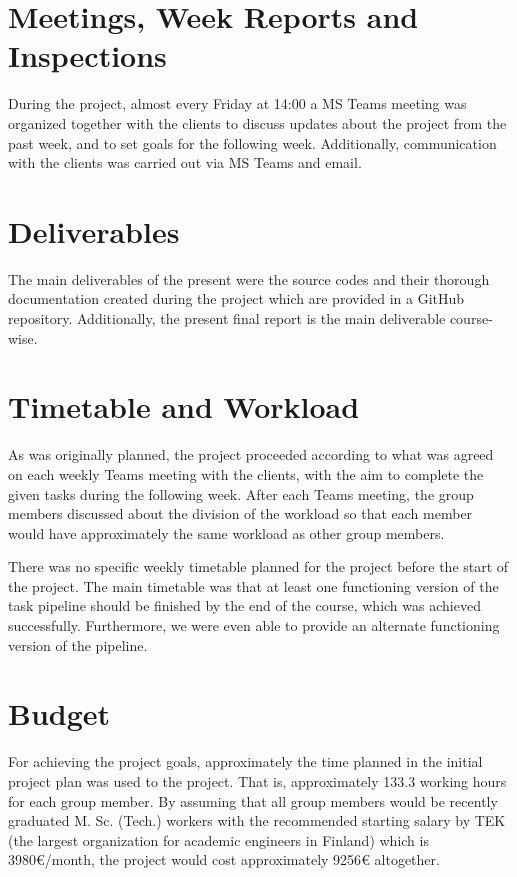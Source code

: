 \section{Meetings, Week Reports and Inspections}

During the project, almost every Friday at 14:00 a MS Teams meeting was organized together with the clients to discuss updates about the project from the past week, and to set goals for the following week. Additionally, communication with the clients was carried out via MS Teams and email.

\section{Deliverables}

The main deliverables of the present were the source codes and their thorough documentation created during the project which are provided in a GitHub repository. Additionally, the present final report is the main deliverable course-wise.

\section{Timetable and Workload}

As was originally planned, the project proceeded according to what was agreed on each weekly Teams meeting with the clients, with the aim to complete the given tasks during the following week. After each Teams meeting, the group members discussed about the division of the workload so that each member would have approximately the same workload as other group members.

There was no specific weekly timetable planned for the project before the start of the project. The main timetable was that at least one functioning version of the task pipeline should be finished by the end of the course, which was achieved successfully. Furthermore, we were even able to provide an alternate functioning version of the pipeline.

\section{Budget}

For achieving the project goals, approximately the time planned in the initial project plan was used to the project. That is, approximately 133.3 working hours for each group member. By assuming that all group members would be recently graduated M. Sc. (Tech.) workers with the recommended starting salary by TEK (the largest organization for academic engineers in Finland) which is 3980{\euro}/month, the project would cost approximately 9256{\euro} altogether.

